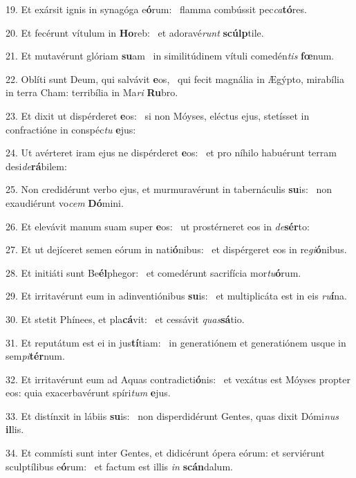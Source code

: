 19. Et exársit ignis in synagóga e\textbf{ó}rum: \ast\  flamma combússit pec\textit{ca}\textbf{tó}res.\

20. Et fecérunt vítulum in \textbf{Ho}reb: \ast\  et adoravé\textit{runt} \textbf{scúlp}tile.\

21. Et mutavérunt glóriam \textbf{su}am \ast\  in similitúdinem vítuli comedén\textit{tis} \textbf{fœ}num.\

22. Oblíti sunt Deum, qui salvávit \textbf{e}os, \ast\  qui fecit magnália in Ægýpto, mirabília in terra Cham: terribília in Ma\textit{ri} \textbf{Ru}bro.\

23. Et dixit ut dispérderet \textbf{e}os: \ast\  si non Móyses, eléctus ejus, stetísset in confractióne in conspéc\textit{tu} \textbf{e}jus:\

24. Ut avérteret iram ejus ne dispérderet \textbf{e}os: \ast\  et pro níhilo habuérunt terram desi\textit{de}\textbf{rá}bilem:\

25. Non credidérunt verbo ejus, et murmuravérunt in tabernáculis \textbf{su}is: \ast\  non exaudiérunt vo\textit{cem} \textbf{Dó}mini.\

26. Et elevávit manum suam super \textbf{e}os: \ast\  ut prostérneret eos in \textit{de}\textbf{sér}to:\

27. Et ut dejíceret semen eórum in nati\textbf{ó}nibus: \ast\  et dispérgeret eos in re\textit{gi}\textbf{ó}nibus.\

28. Et initiáti sunt Be\textbf{él}phegor: \ast\  et comedérunt sacrifícia mor\textit{tu}\textbf{ó}rum.\

29. Et irritavérunt eum in adinventiónibus \textbf{su}is: \ast\  et multiplicáta est in eis \textit{ru}\textbf{í}na.\

30. Et stetit Phínees, et pla\textbf{cá}vit: \ast\  et cessávit \textit{quas}\textbf{sá}tio.\

31. Et reputátum est ei in jus\textbf{tí}tiam: \ast\  in generatiónem et generatiónem usque in sem\textit{pi}\textbf{tér}num.\

32. Et irritavérunt eum ad Aquas contradicti\textbf{ó}nis: \ast\  et vexátus est Móyses propter eos: quia exacerbavérunt spíri\textit{tum} \textbf{e}jus.\

33. Et distínxit in lábiis \textbf{su}is: \ast\  non disperdidérunt Gentes, quas dixit Dómi\textit{nus} \textbf{il}lis.\

34. Et commísti sunt inter Gentes, et didicérunt ópera eórum: et serviérunt sculptílibus e\textbf{ó}rum: \ast\  et factum est illis \textit{in} \textbf{scán}dalum.\

